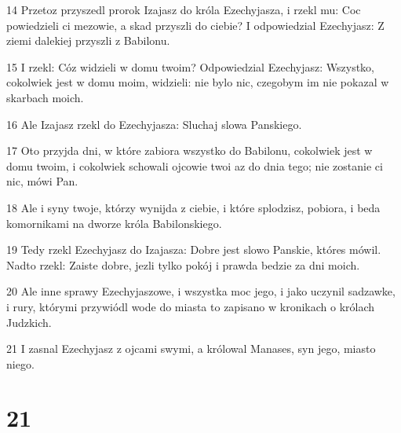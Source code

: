 \par 14 Przetoz przyszedl prorok Izajasz do króla Ezechyjasza, i rzekl mu: Coc powiedzieli ci mezowie, a skad przyszli do ciebie? I odpowiedzial Ezechyjasz: Z ziemi dalekiej przyszli z Babilonu.
\par 15 I rzekl: Cóz widzieli w domu twoim? Odpowiedzial Ezechyjasz: Wszystko, cokolwiek jest w domu moim, widzieli: nie bylo nic, czegobym im nie pokazal w skarbach moich.
\par 16 Ale Izajasz rzekl do Ezechyjasza: Sluchaj slowa Panskiego.
\par 17 Oto przyjda dni, w które zabiora wszystko do Babilonu, cokolwiek jest w domu twoim, i cokolwiek schowali ojcowie twoi az do dnia tego; nie zostanie ci nic, mówi Pan.
\par 18 Ale i syny twoje, którzy wynijda z ciebie, i które splodzisz, pobiora, i beda komornikami na dworze króla Babilonskiego.
\par 19 Tedy rzekl Ezechyjasz do Izajasza: Dobre jest slowo Panskie, któres mówil. Nadto rzekl: Zaiste dobre, jezli tylko pokój i prawda bedzie za dni moich.
\par 20 Ale inne sprawy Ezechyjaszowe, i wszystka moc jego, i jako uczynil sadzawke, i rury, którymi przywiódl wode do miasta to zapisano w kronikach o królach Judzkich.
\par 21 I zasnal Ezechyjasz z ojcami swymi, a królowal Manases, syn jego, miasto niego.

\chapter{21}

